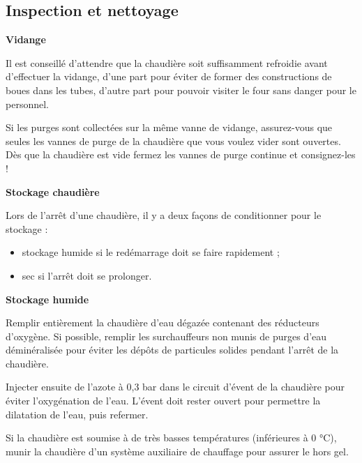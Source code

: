 \subsection{Inspection et nettoyage}

\vspace{0.3cm}
\textbf{Vidange}
\vspace{0.3cm} 

Il est conseillé d’attendre que la chaudière soit suffisamment refroidie avant d’effectuer la vidange, d’une part pour éviter de former des constructions de boues dans les tubes, d’autre part pour pouvoir visiter le four sans danger pour le personnel.
\vspace{0.3cm}

Si les purges sont collectées sur la même vanne de vidange, assurez-vous que seules les vannes de purge de la chaudière que vous voulez vider sont ouvertes. Dès que la chaudière est vide fermez les vannes de purge continue et consignez-les !



\vspace{0.3cm}
\textbf{Stockage chaudière}
\vspace{0.3cm}


Lors de l’arrêt d’une chaudière, il y a deux façons de conditionner pour le stockage : 
 \begin{itemize} 
\item stockage humide si le redémarrage doit se faire rapidement ;
\item  sec si l’arrêt doit se prolonger.

\end{itemize}


\vspace{0.3cm} 
\textbf{Stockage humide}
\vspace{0.3cm}

Remplir entièrement la chaudière d’eau dégazée contenant des réducteurs d’oxygène. Si possible, remplir les surchauffeurs non munis de purges d’eau déminéralisée pour éviter les dépôts de particules solides pendant l’arrêt de la chaudière.
\vspace{0.3cm}

Injecter ensuite de l’azote à 0,3 bar dans le circuit d’évent de la chaudière pour éviter l’oxygénation de l’eau. L’évent doit rester ouvert pour permettre la dilatation de l’eau, puis refermer.
\vspace{0.3cm}

Si la chaudière est soumise à de très basses températures (inférieures à 0 °C), munir la chaudière d’un système auxiliaire de chauffage pour assurer le hors gel.

